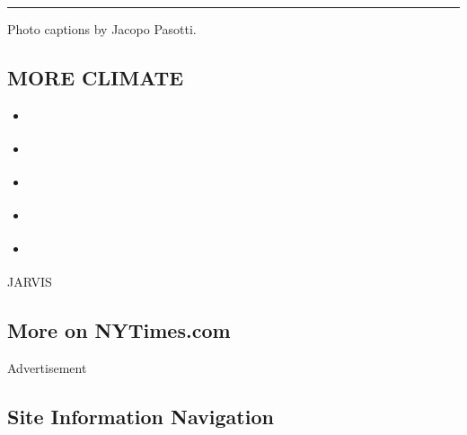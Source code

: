 \begin{center}\rule{0.5\linewidth}{\linethickness}\end{center}

Photo captions by Jacopo Pasotti.

\hypertarget{more-climate}{%
\subsection{MORE CLIMATE}\label{more-climate}}

\begin{itemize}
\tightlist
\item
  \href{https://www.nytimes.com/interactive/2019/04/10/magazine/climate-change-pinkertons.html}{}
\item
  \href{https://www.nytimes.com/interactive/2019/04/11/magazine/climate-change-exxon-renewable-energy.html}{}
\item
  \href{https://www.nytimes.com/interactive/2019/04/09/magazine/climate-change-capitalism.html}{}
\item
  \href{https://www.nytimes.com/interactive/2019/04/09/magazine/climate-change-politics-economics.html}{}
\item
  \href{https://www.nytimes.com/interactive/2019/04/09/magazine/climate-change-peru-law.html}{}
\end{itemize}

JARVIS

\hypertarget{more-on-nytimescom}{%
\subsection{More on NYTimes.com}\label{more-on-nytimescom}}

Advertisement

\hypertarget{site-information-navigation}{%
\subsection{Site Information
Navigation}\label{site-information-navigation}}

